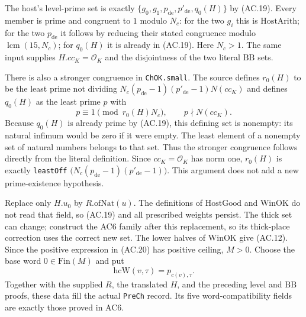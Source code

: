 \documentclass[11pt,a4paper]{article}
\numberwithin{equation}{section}
\theoremstyle{remark}\newtheorem{remark}[theorem]{Remark}
\begin{document}
The host's level-prime set is exactly
$\{g_0,g_1,p_{\mathrm{de}},p'_{\mathrm{de}},q_0(H)\}$ by
(AC.19). Every member is prime and congruent to $1$ modulo $N_c$:
for the two $g_i$ this is $\mathrm{HostArith}$; for the two
$p_{\mathrm{de}}$ it follows by reducing their stated congruence
modulo $\operatorname{lcm}(15,N_c)$; for $q_0(H)$ it is already
in (AC.19). Here $N_c>1$.
The same input supplies $H.cc_K=\mathcal O_K$ and the disjointness
of the two literal $\mathrm{BB}$ sets.

There is also a stronger congruence in \texttt{ChOK.small}.
The source defines $r_0(H)$ to be the least prime not dividing
$N_c(p_{\mathrm{de}}-1)(p'_{\mathrm{de}}-1)N(cc_K)$ and defines
$q_0(H)$ as the least prime $p$ with
\[
              p\equiv1\pmod {r_0(H)N_c},
                           \qquad p\nmid N(cc_K).
\]
Because $q_0(H)$ is already prime by (AC.19), this defining set is
nonempty: its natural infimum would be zero if it were empty.
The least element of a nonempty set of natural numbers belongs to
that set. Thus the stronger congruence follows directly from the
literal definition. Since $cc_K=\mathcal O_K$ has norm one,
$r_0(H)$ is exactly \texttt{leastOff}
$\bigl(N_c(p_{\mathrm{de}}-1)(p'_{\mathrm{de}}-1)\bigr)$.
This argument does not add a new prime-existence hypothesis.

Replace only $H.u_0$ by $R.\mathrm{ofNat}(u)$.
The definitions of $\mathrm{HostGood}$ and $\mathrm{WinOK}$ do not
read that field, so (AC.19) and all prescribed weights persist.
The thick set can change; construct the AC6 family after this
replacement, so its thick-place correction uses the correct new set.
The lower halves of $\mathrm{WinOK}$ give (AC.12).
Since the positive expression in (AC.20) has positive ceiling,
$M>0$. Choose the base word $0\in\mathrm{Fin}(M)$ and put
\[
                         \mathrm{hcW}(v,\tau)=p_{c(v),\tau}.
\]
Together with the supplied $R$, the translated $H$, and the preceding
level and $\mathrm{BB}$ proofs, these data fill the actual
\texttt{PreCh} record. Its five word-compatibility fields are exactly
those proved in AC6.
\end{document}

